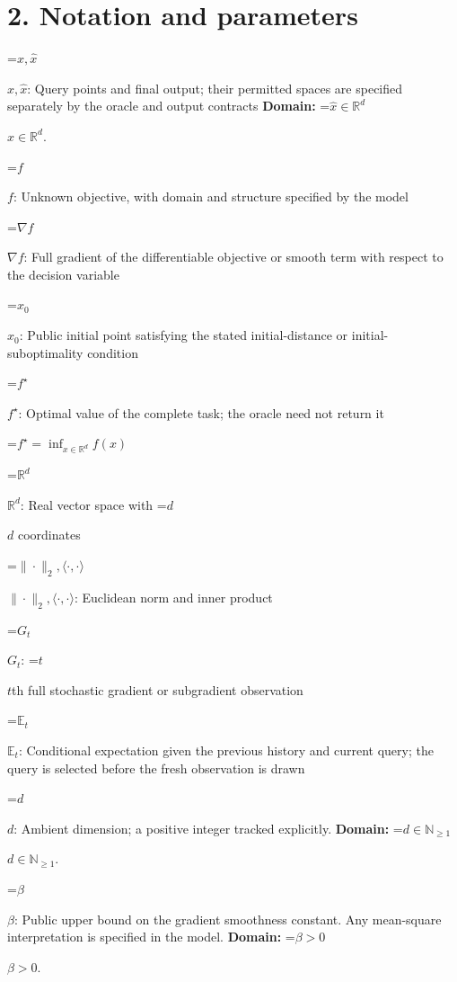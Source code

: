 \documentclass[10pt,a4paper]{article}
\newcommand{\AtlasMath}[1]{\par\begingroup\centering\setbox0=\hbox{$\displaystyle #1$}\ifdim\wd0>1.4\linewidth\typeout{ATLAS WIDE FORMULA: \the\wd0}\fi\ifdim\wd0>\linewidth\resizebox{\linewidth}{!}{\box0}\else\box0\fi\par\endgroup}
\newcommand{\AtlasInlineMath}[1]{\begingroup\setbox0=\hbox{$#1$}\ifdim\wd0>.4\linewidth\endgroup\AtlasMath{#1}\else\endgroup$#1$\fi}
\begin{document}
\section{2. Notation and parameters}


\AtlasInlineMath{x,\widehat{x}}: Query points and final output; their permitted spaces are specified separately by the oracle and output contracts \textbf{Domain:} \AtlasInlineMath{\widehat{x}\in \mathbb{R}^d}.



\AtlasInlineMath{f}: Unknown objective, with domain and structure specified by the model



\AtlasInlineMath{\nabla f}: Full gradient of the differentiable objective or smooth term with respect to the decision variable



\AtlasInlineMath{x_0}: Public initial point satisfying the stated initial-distance or initial-suboptimality condition



\AtlasInlineMath{f^\star}: Optimal value of the complete task; the oracle need not return it




\AtlasMath{f^\star=\inf_{x\in \mathbb{R}^d}f(x)}




\AtlasInlineMath{\mathbb{R}^d}: Real vector space with \AtlasInlineMath{d} coordinates



\AtlasInlineMath{\|\cdot\|_2,\langle\cdot,\cdot\rangle}: Euclidean norm and inner product



\AtlasInlineMath{G_t}: \AtlasInlineMath{t}th full stochastic gradient or subgradient observation



\AtlasInlineMath{\mathbb{E}_t}: Conditional expectation given the previous history and current query; the query is selected before the fresh observation is drawn



\AtlasInlineMath{d}: Ambient dimension; a positive integer tracked explicitly. \textbf{Domain:} \AtlasInlineMath{d\in\mathbb{N}_{\ge1}}.



\AtlasInlineMath{\beta}: Public upper bound on the gradient smoothness constant. Any mean-square interpretation is specified in the model. \textbf{Domain:} \AtlasInlineMath{\beta>0}.
\end{document}
